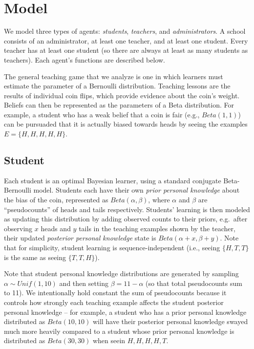 \documentclass[10pt, letterpaper]{apa6}
\begin{document}
\section{Model}\label{model}

We model three types of agents: \emph{students}, \emph{teachers}, and
\emph{administrators}. A school consists of an administrator, at least
one teacher, and at least one student. Every teacher has at least one
student (so there are always at least as many students as teachers).
Each agent's functions are described below.

The general teaching game that we analyze is one in which learners must
estimate the parameter of a Bernoulli distribution. Teaching lessons are
the results of individual coin flips, which provide evidence about the
coin's weight. Beliefs can then be represented as the parameters of a
Beta distribution. For example, a student who has a weak belief that a
coin is fair (e.g., \(Beta(1,1)\)) can be pursuaded that it is actually
biased towards heads by seeing the examples \(E = \{H, H, H, H, H\}\).

\subsection{Student}\label{student}

Each student is an optimal Bayesian learner, using a standard conjugate
Beta-Bernoulli model. Students each have their own \emph{prior personal
knowledge} about the bias of the coin, represented as
\(Beta(\alpha,\beta)\), where \(\alpha\) and \(\beta\) are
``pseudocounts'' of heads and tails respectively. Students' learning is
then modeled as updating this distribution by adding observed counts to
their priors, e.g.~after observing \(x\) heads and \(y\) tails in the
teaching examples shown by the teacher, their updated \emph{posterior
personal knowledge} state is \(Beta(\alpha + x, \beta + y)\). Note that
for simplicity, student learning is sequence-independent (i.e., seeing
\(\{H, T, T\}\) is the same as seeing \(\{T, T, H\}\)).

Note that student personal knowledge distributions are generated by
sampling \(\alpha \sim Unif(1,10)\) and then setting
\(\beta = 11 - \alpha\) (so that total pseudocounts sum to 11). We
intentionally hold constant the sum of pseudocounts because it controls
how strongly each teaching example affects the student posterior
personal knowledge -- for example, a student who has a prior personal
knowledge distributed as \(Beta(10,10)\) will have their posterior
personal knowledge swayed much more heavily compared to a student whose
prior personal knowledge is distributed as \(Beta(30,30)\) when seein
\({H, H, H, H, T}\).
\end{document}
